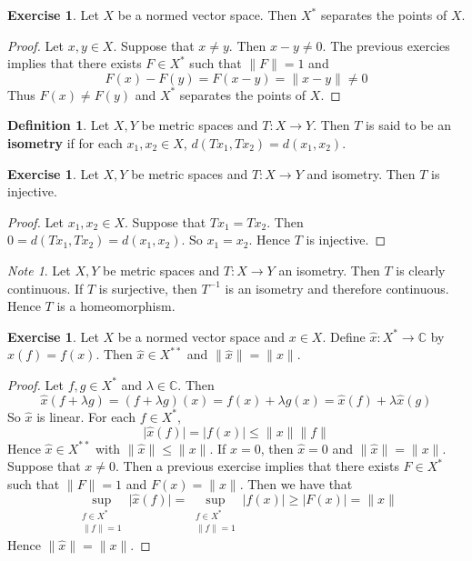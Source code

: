 \documentclass[12pt]{amsart}
\theoremstyle{definition}
\newtheorem{defn}[definition]{Definition}
\theoremstyle{remark}
\newtheorem{note}[remark]{Note}
\theoremstyle{definition}
\newtheorem{ex}[definition]{Exercise}
\newcommand{\lam}{\lambda}
\newcommand{\C}{\mathbb{C}}
\begin{document}
	\begin{ex}
		Let $X$ be a normed vector space. Then $X^*$ separates the points of $X$. 
	\end{ex}
	
	\begin{proof}
		Let $x, y \in X$. Suppose that $x \neq y$. Then $x-y \neq 0$. The previous exercies implies that there exists $F \in X^*$ such that $\|F \|= 1$ and $$F(x) - F(y) = F(x-y) = \|x-y \|\neq 0$$ Thus $F(x) \neq F(y)$ and $X^*$ separates the points of $X$.
	\end{proof}
	
	\begin{defn}
		Let $X, Y$ be metric spaces and $T : X \rightarrow Y$. Then $T$ is said to be an \textbf{isometry} if for each $x_1, x_2 \in X$, $d( Tx_1, Tx_2) = d(x_1,x_2) $.
	\end{defn}
	
	\begin{ex}
		Let $X,Y$ be metric spaces and $T:X \rightarrow Y$ and isometry. Then $T$ is injective.
	\end{ex}
	
	\begin{proof}
		Let $x_1, x_2 \in X$. Suppose that $Tx_1=Tx_2$. Then $0= d( Tx_1, Tx_2) = d(x_1,x_2)$. So $x_1 = x_2$. Hence $T$ is injective.
	\end{proof}
	
	\begin{note}
		Let $X,Y$ be metric spaces and $T:X \rightarrow Y$ an isometry. Then $T$ is clearly continuous. If $T$ is surjective, then $T^{-1}$ is an isometry and therefore continuous. Hence $T$ is a homeomorphism.
	\end{note}
	
	\begin{ex}
		Let $X$ be a normed vector space and $x \in X$. Define $\hat{x}:X^* \rightarrow \C$ by $\hat{x}(f) = f(x)$. Then $\hat{x} \in X^{**}$ and $\|\hat{x} \|= \|x \|$.
	\end{ex}
	
	\begin{proof}
		Let $f,g \in X^*$ and $\lam \in \C$. Then $$\hat{x}(f+\lam g) = (f+ \lam g)(x) = f(x) + \lam g(x) = \hat{x}(f) + \lam \hat{x}(g)$$
		So $\hat{x}$ is linear. For each $f \in X^*$, $$\vert \hat{x}(f) \vert = \vert f(x) \vert \leq \|x \|\|f \|$$ Hence $\hat{x} \in X^{**}$ with $\|\hat{x} \|\leq \|x \|$. If $x=0$, then $\hat{x} = 0$ and $\|\hat{x} \|= \|x \|$. Suppose that $x \neq 0$. Then a previous exercise implies that there exists $F \in X^*$ such that $\|F \|=1$ and $F(x) = \|x \|$. Then we have that $$\sup_{\substack{f \in X^* \\ \|f \|= 1 } } \vert \hat{x}(f) \vert  = \sup_{\substack{f \in X^* \\ \|f \|= 1 }}  \vert f(x) \vert \geq \vert F(x) \vert = \|x \|$$
		Hence $\|\hat{x} \|= \|x \|$.
	\end{proof}
	
\end{document}
